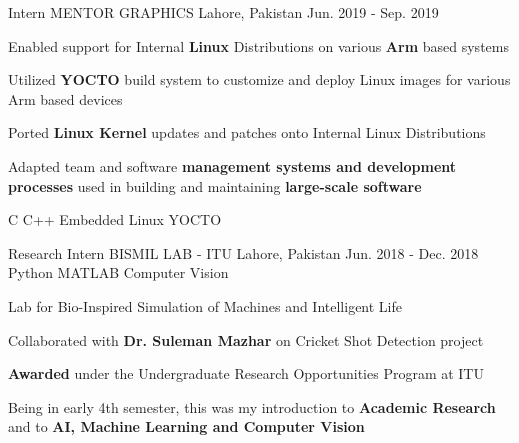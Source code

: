 \begin{cventries}
  \cventry
    {Intern} %
    {MENTOR GRAPHICS} %
    {Lahore, Pakistan} %
    {Jun. 2019 - Sep. 2019} %
    {
      \begin{cvitems} %
        \item Enabled support for Internal \textbf{Linux} Distributions on various \textbf{Arm }based systems
        \item Utilized \textbf{YOCTO} build system to customize and deploy Linux images for various Arm based devices
        \item Ported \textbf{Linux Kernel} updates and patches onto Internal Linux Distributions
        \item Adapted team and software \textbf{management systems and development processes} used in building and maintaining \textbf{large-scale software}
      \end{cvitems}
    }
    {C \acvSep C++ \acvSep Embedded Linux \acvSep YOCTO}

  \cventry
    {Research Intern} %
    {BISMIL LAB - ITU} %
    {Lahore, Pakistan} %
    {Jun. 2018 - Dec. 2018} %
    {}
    {Python \acvSep MATLAB \acvSep Computer Vision}

    \cventry
    {Lab for Bio-Inspired Simulation of Machines and Intelligent Life} %
    {} %
    {} %
    {} %
    {
      \begin{cvitems} %
        \item Collaborated with \textbf{Dr. Suleman Mazhar} on Cricket Shot Detection project
        \item \textbf{Awarded} under the Undergraduate Research Opportunities Program at ITU
        \item Being in early 4th semester, this was my introduction to \textbf{Academic Research} and to \textbf{AI, Machine Learning and Computer Vision}
      \end{cvitems}
    }
    {}

\end{cventries}
